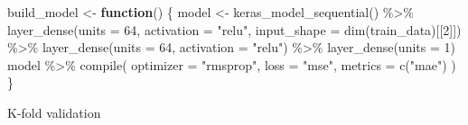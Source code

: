 \documentclass[
]{article}
\newenvironment{Shaded}{\begin{snugshade}}{\end{snugshade}}
\newcommand{\AttributeTok}[1]{\textcolor[rgb]{0.77,0.63,0.00}{#1}}
\newcommand{\ControlFlowTok}[1]{\textcolor[rgb]{0.13,0.29,0.53}{\textbf{#1}}}
\newcommand{\DecValTok}[1]{\textcolor[rgb]{0.00,0.00,0.81}{#1}}
\newcommand{\FunctionTok}[1]{\textcolor[rgb]{0.00,0.00,0.00}{#1}}
\newcommand{\NormalTok}[1]{#1}
\newcommand{\OtherTok}[1]{\textcolor[rgb]{0.56,0.35,0.01}{#1}}
\newcommand{\SpecialCharTok}[1]{\textcolor[rgb]{0.00,0.00,0.00}{#1}}
\newcommand{\StringTok}[1]{\textcolor[rgb]{0.31,0.60,0.02}{#1}}
\begin{document}
\begin{Shaded}
\begin{Highlighting}[]
\NormalTok{build\_model }\OtherTok{\textless{}{-}} \ControlFlowTok{function}\NormalTok{() \{ }
\NormalTok{  model }\OtherTok{\textless{}{-}} \FunctionTok{keras\_model\_sequential}\NormalTok{() }\SpecialCharTok{\%\textgreater{}\%}
    \FunctionTok{layer\_dense}\NormalTok{(}\AttributeTok{units =} \DecValTok{64}\NormalTok{, }\AttributeTok{activation =} \StringTok{"relu"}\NormalTok{, }
                \AttributeTok{input\_shape =} \FunctionTok{dim}\NormalTok{(train\_data)[[}\DecValTok{2}\NormalTok{]]) }\SpecialCharTok{\%\textgreater{}\%}
    \FunctionTok{layer\_dense}\NormalTok{(}\AttributeTok{units =} \DecValTok{64}\NormalTok{, }\AttributeTok{activation =} \StringTok{"relu"}\NormalTok{) }\SpecialCharTok{\%\textgreater{}\%}
    \FunctionTok{layer\_dense}\NormalTok{(}\AttributeTok{units =} \DecValTok{1}\NormalTok{) }
\NormalTok{model }\SpecialCharTok{\%\textgreater{}\%} \FunctionTok{compile}\NormalTok{(}
  \AttributeTok{optimizer =} \StringTok{"rmsprop"}\NormalTok{, }
  \AttributeTok{loss =} \StringTok{"mse"}\NormalTok{,}
  \AttributeTok{metrics =} \FunctionTok{c}\NormalTok{(}\StringTok{"mae"}\NormalTok{)}
\NormalTok{  ) }
\NormalTok{\}}
\end{Highlighting}
\end{Shaded}

K-fold validation
\end{document}

